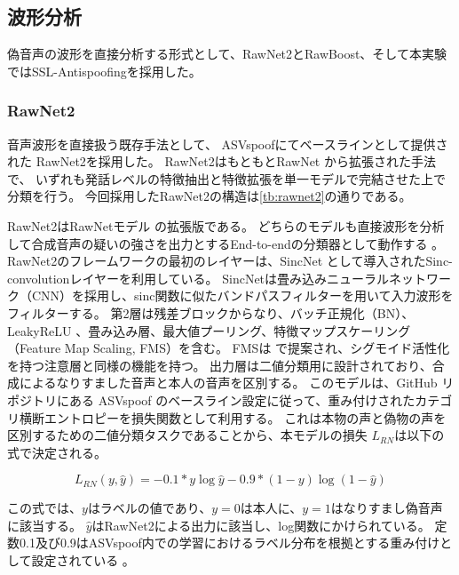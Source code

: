 \subsection{波形分析}
偽音声の波形を直接分析する形式として、RawNet2とRawBoost、そして本実験ではSSL-Antispoofingを採用した。

\subsubsection{RawNet2}
音声波形を直接扱う既存手法として、
ASVspoofにてベースラインとして提供された \cite{WANG2020101114}RawNet2を採用した。
RawNet2はもともとRawNet \cite{jung19b_interspeech}から拡張された手法で、
いずれも発話レベルの特徴抽出と特徴拡張を単一モデルで完結させた上で分類を行う。
今回採用したRawNet2の構造は\cref{tb:rawnet2}の通りである。

RawNet2はRawNetモデル \cite{jung19b_interspeech}の拡張版である。
どちらのモデルも直接波形を分析して合成音声の疑いの強さを出力とするEnd-to-endの分類器として動作する \cite{jung19b_interspeech}。
RawNet2のフレームワークの最初のレイヤーは、SincNet \cite{8639585,ravanelli19_interspeech}として導入されたSinc-convolutionレイヤーを利用している。
SincNetは畳み込みニューラルネットワーク（CNN）を採用し、sinc関数に似たバンドパスフィルターを用いて入力波形をフィルターする。
第2層は残差ブロックからなり、バッチ正規化（BN）、LeakyReLU \cite{maas2013rectifier}、畳み込み層、最大値プーリング、特徴マップスケーリング（Feature Map Scaling, FMS）を含む。
FMSは \cite{woo2018cbam}で提案され、シグモイド活性化 \cite{jung20c_interspeech}を持つ注意層と同様の機能を持つ。
出力層は二値分類用に設計されており、合成によるなりすました音声と本人の音声を区別する。
このモデルは、GitHub リポジトリにある ASVspoof のベースライン設定に従って、重み付けされたカテゴリ横断エントロピーを損失関数として利用する。
これは本物の声と偽物の声を区別するための二値分類タスクであることから、本モデルの損失 $ L_{RN} $は以下の式で決定される。

\begin{equation}
    L_{RN}(y, \hat{y}) = -0.1 * y \log{\hat{y}} - 0.9 * (1-y) \log{(1-\hat{y})}
\end{equation}

この式では、$y$はラベルの値であり、$y=0$は本人に、$y=1$はなりすまし偽音声に該当する。
$\hat{y}$はRawNet2による出力に該当し、log関数にかけられている。
定数0.1及び0.9はASVspoof内での学習におけるラベル分布を根拠とする重み付けとして設定されている \cite{yamagishi21_asvspoof}。


